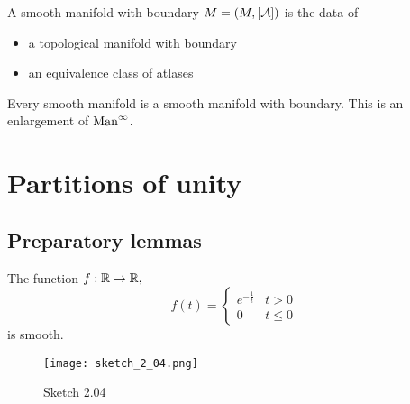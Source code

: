 \begin{definition*}
    A smooth manifold with boundary \(M=(M,[\mathcal{A}])\) is the data of 
    \begin{itemize}
        \item a topological manifold with boundary 
        \item an equivalence class of atlases 
    \end{itemize}    
\end{definition*}

\begin{remark}
    Every smooth manifold is a smooth manifold with boundary. This is an enlargement of 
    \(\text{Man}^\infty\).
\end{remark}

\section{Partitions of unity}

\subsection{Preparatory lemmas}

\begin{lemma}\label{lem:2.4}
    The function \(f:\mathbb{R}\to\mathbb{R},\)
    \[f(t)=\begin{cases}
        e^{-\frac{1}{t}} & t>0\\
        0 & t\leq 0
    \end{cases}\]
    is smooth.
\end{lemma}

\begin{figure}[H]
    \centering
    \texttt{[image: sketch\_2\_04.png]}
    \caption{Sketch 2.04}
\end{figure}


